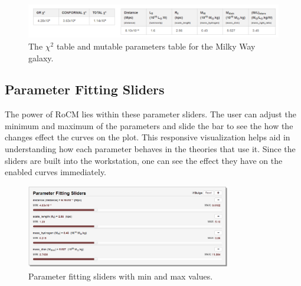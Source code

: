 \documentclass[conference]{IEEEtran-modified}
\begin{document}
%

\begin{figure}[h!]
\centering
\includegraphics[width=\textwidth]{MILKY-WAY-CHI-PARAMS}
\caption{The $\chi^2$ table and mutable parameters table for the Milky Way galaxy.}
\label{param_table_fig}
\end{figure}

\subsection{Parameter Fitting Sliders}

The power of RoCM lies within these parameter sliders. The user can adjust the minimum and maximum of the parameters and slide the bar to see the how the changes effect the curves on the plot. This responsive visualization helps aid in understanding how each parameter behaves in the theories that use it.  Since the sliders are built into the workstation, one can see the effect they have on the enabled curves immediately.

\begin{figure}[h!]
\centering
\includegraphics[width=0.8\textwidth]{paramslider_long}
\caption{Parameter fitting sliders with min and max values.}
\label{slider_fig}
\end{figure}
\end{document}
